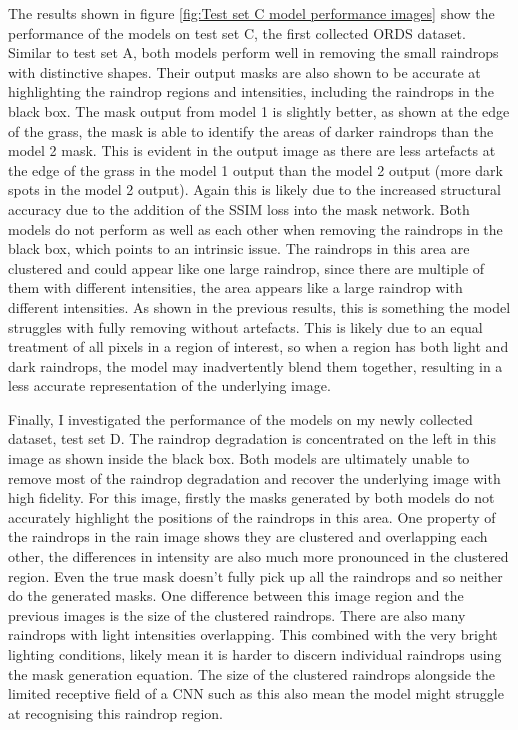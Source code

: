 \documentclass[11pt]{ociamthesis}  %
\begin{document}
The results shown in figure \ref{fig:Test set C model performance images} show the performance of the models on test set C, the first collected ORDS dataset. Similar to test set A, both models perform well in removing the small raindrops with distinctive shapes. Their output masks are also shown to be accurate at highlighting the raindrop regions and intensities, including the raindrops in the black box. The mask output from model 1 is slightly better, as shown at the edge of the grass, the mask is able to identify the areas of darker raindrops than the model 2 mask. This is evident in the output image as there are less artefacts at the edge of the grass in the model 1 output than the model 2 output (more dark spots in the model 2 output). Again this is likely due to the increased structural accuracy due to the addition of the SSIM loss into the mask network. Both models do not perform as well as each other when removing the raindrops in the black box, which points to an intrinsic issue. The raindrops in this area are clustered and could appear like one large raindrop, since there are multiple of them with different intensities, the area appears like a large raindrop with different intensities. As shown in the previous results, this is something the model struggles with fully removing without artefacts. This is likely due to an equal treatment of all pixels in a region of interest, so when a region has both light and dark raindrops, the model may inadvertently blend them together, resulting in a less accurate representation of the underlying image. 

Finally, I investigated the performance of the models on my newly collected dataset, test set D. The raindrop degradation is concentrated on the left in this image as shown inside the black box. Both models are ultimately unable to remove most of the raindrop degradation and recover the underlying image with high fidelity. For this image, firstly the masks generated by both models do not accurately highlight the positions of the raindrops in this area. One property of the raindrops in the rain image shows they are clustered and overlapping each other, the differences in intensity are also much more pronounced in the clustered region. Even the true mask doesn't fully pick up all the raindrops and so neither do the generated masks. One difference between this image region and the previous images is the size of the clustered raindrops. There are also many raindrops with light intensities overlapping. This combined with the very bright lighting conditions, likely mean it is harder to discern individual raindrops using the mask generation equation. The size of the clustered raindrops alongside the limited receptive field of a CNN such as this also mean the model might struggle at recognising this raindrop region. 
\end{document}
